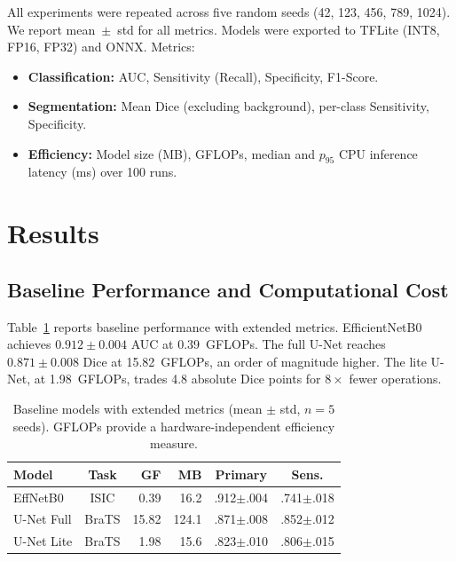 \documentclass[10pt,twocolumn]{article}
\begin{document}
All experiments were repeated across five random seeds (42, 123, 456, 789, 1024). We report mean~$\pm$~std for all metrics. Models were exported to TFLite (INT8, FP16, FP32) and ONNX. Metrics:
\begin{itemize}
    \item \textbf{Classification:} AUC, Sensitivity (Recall), Specificity, F1-Score.
    \item \textbf{Segmentation:} Mean Dice (excluding background), per-class Sensitivity, Specificity.
    \item \textbf{Efficiency:} Model size (MB), GFLOPs, median and $p_{95}$ CPU inference latency (ms) over 100 runs.
\end{itemize}

\section{Results}
\label{sec:results}

\subsection{Baseline Performance and Computational Cost}

Table~\ref{tab:baselines} reports baseline performance with extended metrics. EfficientNetB0 achieves $0.912{\pm}0.004$ AUC at 0.39~GFLOPs. The full U-Net reaches $0.871{\pm}0.008$ Dice at 15.82~GFLOPs, an order of magnitude higher. The lite U-Net, at 1.98~GFLOPs, trades 4.8 absolute Dice points for $8{\times}$ fewer operations.

\begin{table}[t]
\centering
\caption{Baseline models with extended metrics (mean $\pm$ std, $n{=}5$ seeds). GFLOPs provide a hardware-independent efficiency measure.}
\label{tab:baselines}
\small
\begin{tabular}{@{}lcrrcc@{}}
\toprule
Model & Task & GF & MB & Primary & Sens. \\
\midrule
EffNetB0 & ISIC & 0.39 & 16.2 & .912$\pm$.004 & .741$\pm$.018 \\
U-Net Full & BraTS & 15.82 & 124.1 & .871$\pm$.008 & .852$\pm$.012 \\
U-Net Lite & BraTS & 1.98 & 15.6 & .823$\pm$.010 & .806$\pm$.015 \\
\bottomrule
\end{tabular}
\end{table}
\end{document}
